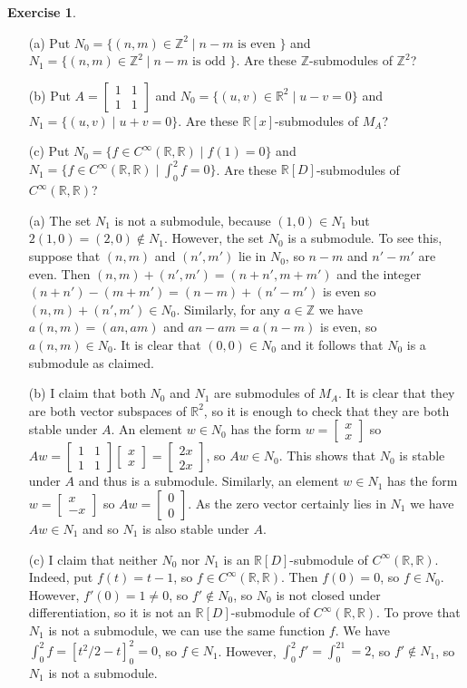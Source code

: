 \documentclass{amsart}
\newcommand{\bsm}       {\left[\begin{smallmatrix}}
\newcommand{\esm}       {\end{smallmatrix}\right]}
\newcommand{\R}         {{\mathbb{R}}}
\newcommand{\Z}         {{\mathbb{Z}}}
\newcommand{\CRR}       {C^\infty(\R,\R)}
\newcommand{\st}        {\;|\;}
\newcommand{\ip}[1]     {\langle #1\rangle}
\renewcommand{\:}{\colon}
\theoremstyle{definition}
\newtheorem{exercise}{Exercise}[section]
\renewenvironment{solution}{\SolutionAtEnd}{\endSolutionAtEnd}
\begin{document}
\begin{exercise}
 \begin{itemize}
  \item[(a)] Put $N_0=\{(n,m)\in\Z^2\st n-m\text{ is even }\}$ and
   $N_1=\{(n,m)\in\Z^2\st n-m\text{ is odd }\}$.  Are these
   $\Z$-submodules of $\Z^2$?
  \item[(b)] Put $A=\bsm 1&1\\1&1\esm$ and
   $N_0=\{(u,v)\in\R^2\st u-v=0\}$ and $N_1=\{(u,v)\st u+v=0\}$.  Are
   these $\R[x]$-submodules of $M_A$?
  \item[(c)] Put $N_0=\{f\in\CRR\st f(1)=0\}$ and
   $N_1=\{f\in\CRR\st\int_0^2 f=0\}$.  Are these $\R[D]$-submodules
   of $\CRR$?
 \end{itemize}
\end{exercise}
\begin{solution}
 \begin{itemize}
  \item[(a)] The set $N_1$ is not a submodule, because $(1,0)\in N_1$
   but $2(1,0)=(2,0)\not\in N_1$.  However, the set $N_0$ is a
   submodule.  To see this, suppose that $(n,m)$ and $(n',m')$ lie in
   $N_0$, so $n-m$ and $n'-m'$ are even.  Then
   $(n,m)+(n',m')=(n+n',m+m')$ and the integer
   $(n+n')-(m+m')=(n-m)+(n'-m')$ is even so $(n,m)+(n',m')\in N_0$.
   Similarly, for any $a\in\Z$ we have $a(n,m)=(an,am)$ and
   $an-am=a(n-m)$ is even, so $a(n,m)\in N_0$.  It is clear that
   $(0,0)\in N_0$ and it follows that $N_0$ is a submodule as
   claimed.
  \item[(b)] I claim that both $N_0$ and $N_1$ are submodules of
   $M_A$.  It is clear that they are both vector subspaces of $\R^2$,
   so it is enough to check that they are both stable under $A$.  An
   element $w\in N_0$ has the form $w=\bsm x\\x\esm$ so
   $Aw=\bsm 1&1\\1&1\esm\bsm x\\x\esm=\bsm 2x\\2x\esm$, so
   $Aw\in N_0$.  This shows that $N_0$ is stable under $A$ and thus is
   a submodule.  Similarly, an element $w\in N_1$ has the form
   $w=\bsm x\\-x\esm$ so $Aw=\bsm 0\\0\esm$.  As the zero vector
   certainly lies in $N_1$ we have $Aw\in N_1$ and so $N_1$ is also
   stable under $A$.
  \item[(c)] I claim that neither $N_0$ nor $N_1$ is an
   $\R[D]$-submodule of $\CRR$.  Indeed, put $f(t)=t-1$, so
   $f\in\CRR$.  Then $f(0)=0$, so $f\in N_0$.  However,
   $f'(0)=1\neq 0$, so $f'\not\in N_0$, so $N_0$ is not closed under
   differentiation, so it is not an $\R[D]$-submodule of $\CRR$.  
   To prove that $N_1$ is not a submodule, we can use the same
   function $f$.  We have $\int_0^2f=[t^2/2-t]_0^2=0$, so $f\in N_1$.
   However, $\int_0^2f'=\int_0^21=2$, so $f'\not\in N_1$, so $N_1$ is
   not a submodule.
 \end{itemize}
\end{solution}
\end{document}
